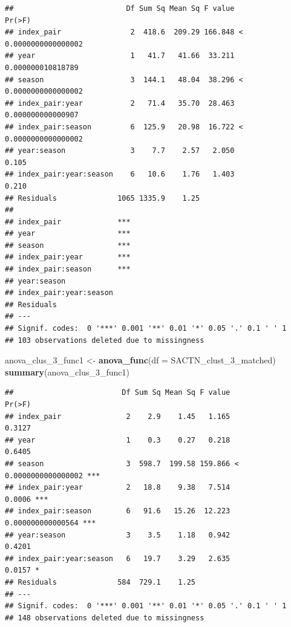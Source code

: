 \documentclass[10pt,A4,]{article}
\newenvironment{Shaded}{\begin{snugshade}}{\end{snugshade}}
\newcommand{\KeywordTok}[1]{\textcolor[rgb]{0.13,0.29,0.53}{\textbf{#1}}}
\newcommand{\DataTypeTok}[1]{\textcolor[rgb]{0.13,0.29,0.53}{#1}}
\newcommand{\StringTok}[1]{\textcolor[rgb]{0.31,0.60,0.02}{#1}}
\newcommand{\NormalTok}[1]{#1}
\begin{document}
\begin{verbatim}
##                          Df Sum Sq Mean Sq F value               Pr(>F)
## index_pair                2  418.6  209.29 166.848 < 0.0000000000000002
## year                      1   41.7   41.66  33.211    0.000000010818789
## season                    3  144.1   48.04  38.296 < 0.0000000000000002
## index_pair:year           2   71.4   35.70  28.463    0.000000000000907
## index_pair:season         6  125.9   20.98  16.722 < 0.0000000000000002
## year:season               3    7.7    2.57   2.050                0.105
## index_pair:year:season    6   10.6    1.76   1.403                0.210
## Residuals              1065 1335.9    1.25                             
##                           
## index_pair             ***
## year                   ***
## season                 ***
## index_pair:year        ***
## index_pair:season      ***
## year:season               
## index_pair:year:season    
## Residuals                 
## ---
## Signif. codes:  0 '***' 0.001 '**' 0.01 '*' 0.05 '.' 0.1 ' ' 1
## 103 observations deleted due to missingness
\end{verbatim}

\begin{Shaded}
\begin{Highlighting}[]
\NormalTok{anova_clus_3_func1 <-}\StringTok{ }\KeywordTok{anova_func}\NormalTok{(}\DataTypeTok{df =}\NormalTok{ SACTN_clust_3_matched)}
\KeywordTok{summary}\NormalTok{(anova_clus_3_func1)}
\end{Highlighting}
\end{Shaded}

\begin{verbatim}
##                         Df Sum Sq Mean Sq F value               Pr(>F)    
## index_pair               2    2.9    1.45   1.165               0.3127    
## year                     1    0.3    0.27   0.218               0.6405    
## season                   3  598.7  199.58 159.866 < 0.0000000000000002 ***
## index_pair:year          2   18.8    9.38   7.514               0.0006 ***
## index_pair:season        6   91.6   15.26  12.223    0.000000000000564 ***
## year:season              3    3.5    1.18   0.942               0.4201    
## index_pair:year:season   6   19.7    3.29   2.635               0.0157 *  
## Residuals              584  729.1    1.25                                 
## ---
## Signif. codes:  0 '***' 0.001 '**' 0.01 '*' 0.05 '.' 0.1 ' ' 1
## 148 observations deleted due to missingness
\end{verbatim}
\end{document}
